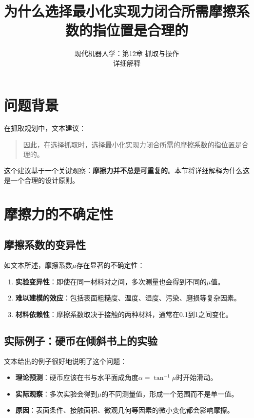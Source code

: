 \documentclass[12pt,a4paper]{article}
\title{为什么选择最小化实现力闭合所需摩擦系数的指位置是合理的}
\author{现代机器人学：第12章 抓取与操作\\
详细解释}
\date{}
\begin{document}
\maketitle

\section{问题背景}

在抓取规划中，文本建议：

\begin{quote}
因此，在选择抓取时，选择最小化实现力闭合所需的摩擦系数的指位置是合理的。
\end{quote}

这个建议基于一个关键观察：\textbf{摩擦力并不总是可重复的}。本节将详细解释为什么这是一个合理的设计原则。

\section{摩擦力的不确定性}

\subsection{摩擦系数的变异性}

如文本所述，摩擦系数$\mu$存在显著的不确定性：

\begin{enumerate}
    \item \textbf{实验变异性}：即使在同一材料对之间，多次测量也会得到不同的$\mu$值。
    \item \textbf{难以建模的效应}：包括表面粗糙度、温度、湿度、污染、磨损等复杂因素。
    \item \textbf{材料依赖性}：摩擦系数取决于接触的两种材料，通常在0.1到1之间变化。
\end{enumerate}

\subsection{实际例子：硬币在倾斜书上的实验}

文本给出的例子很好地说明了这个问题：

\begin{itemize}
    \item \textbf{理论预测}：硬币应该在书与水平面成角度$\alpha = \tan^{-1} \mu$时开始滑动。
    \item \textbf{实际观察}：多次实验会得到$\mu$的不同测量值，形成一个范围而不是单一值。
    \item \textbf{原因}：表面条件、接触面积、微观几何等因素的微小变化都会影响摩擦。
\end{itemize}
\end{document}
